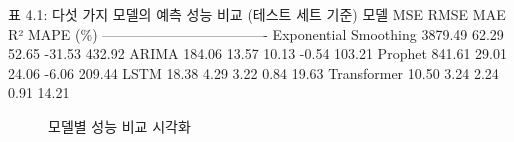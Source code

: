 \documentclass[12pt,ko,a4,]{report}
\begin{document}
표 4.1: 다섯 가지 모델의 예측 성능 비교 (테스트 세트 기준) \textbar{}
모델 \textbar{} MSE \textbar{} RMSE \textbar{} MAE \textbar{} R²
\textbar{} MAPE (\%) \textbar{}
\textbar------\textbar-----\textbar------\textbar-----\textbar-----\textbar----------\textbar{}
\textbar{} Exponential Smoothing \textbar{} 3879.49 \textbar{} 62.29
\textbar{} 52.65 \textbar{} -31.53 \textbar{} 432.92 \textbar{}
\textbar{} ARIMA \textbar{} 184.06 \textbar{} 13.57 \textbar{} 10.13
\textbar{} -0.54 \textbar{} 103.21 \textbar{} \textbar{} Prophet
\textbar{} 841.61 \textbar{} 29.01 \textbar{} 24.06 \textbar{} -6.06
\textbar{} 209.44 \textbar{} \textbar{} LSTM \textbar{} 18.38 \textbar{}
4.29 \textbar{} 3.22 \textbar{} 0.84 \textbar{} 19.63 \textbar{}
\textbar{} Transformer \textbar{} 10.50 \textbar{} 3.24 \textbar{} 2.24
\textbar{} 0.91 \textbar{} 14.21 \textbar{}

\begin{figure}
\centering
{}
\caption{모델별 성능 비교 시각화}
\end{figure}
\end{document}
